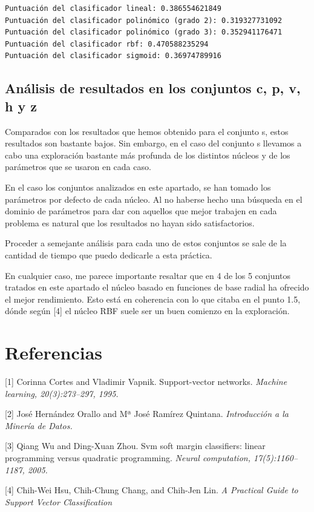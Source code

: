 \documentclass[11pt]{article}
\begin{document}
    \begin{Verbatim}[commandchars=\\\{\}]
Puntuación del clasificador lineal: 0.386554621849
Puntuación del clasificador polinómico (grado 2): 0.319327731092
Puntuación del clasificador polinómico (grado 3): 0.352941176471
Puntuación del clasificador rbf: 0.470588235294
Puntuación del clasificador sigmoid: 0.36974789916

    \end{Verbatim}

    \subsection{Análisis de resultados en los conjuntos c, p, v, h y
z}\label{anuxe1lisis-de-resultados-en-los-conjuntos-c-p-v-h-y-z}

Comparados con los resultados que hemos obtenido para el conjunto s,
estos resultados son bastante bajos. Sin embargo, en el caso del
conjunto s llevamos a cabo una exploración bastante más profunda de los
distintos núcleos y de los parámetros que se usaron en cada caso.

En el caso los conjuntos analizados en este apartado, se han tomado los
parámetros por defecto de cada núcleo. Al no haberse hecho una búsqueda
en el dominio de parámetros para dar con aquellos que mejor trabajen en
cada problema es natural que los resultados no hayan sido
satisfactorios.

Proceder a semejante análisis para cada uno de estos conjuntos se sale
de la cantidad de tiempo que puedo dedicarle a esta práctica.

En cualquier caso, me parece importante resaltar que en 4 de los 5
conjuntos tratados en este apartado el núcleo basado en funciones de
base radial ha ofrecido el mejor rendimiento. Esto está en coherencia
con lo que citaba en el punto 1.5, dónde según {[}4{]} el núcleo RBF
suele ser un buen comienzo en la exploración.

    \section{Referencias}\label{referencias}

{[}1{]} Corinna Cortes and Vladimir Vapnik. Support-vector networks.
\emph{Machine learning, 20(3):273--297, 1995.}

{[}2{]} José Hernández Orallo and Mª José Ramírez Quintana.
\emph{Introducción a la Minería de Datos.}

{[}3{]} Qiang Wu and Ding-Xuan Zhou. Svm soft margin classifiers: linear
programming versus quadratic programming. \emph{Neural computation,
17(5):1160--1187, 2005.}

{[}4{]} Chih-Wei Hsu, Chih-Chung Chang, and Chih-Jen Lin. \emph{A
Practical Guide to Support Vector Classification}


    
    
    
    
\end{document}
